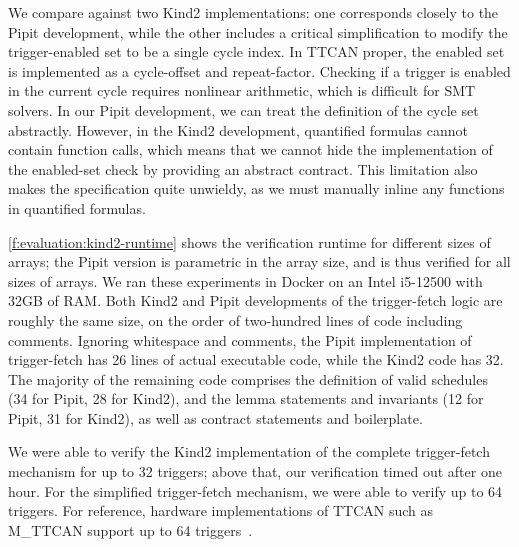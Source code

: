 We compare against two Kind2 implementations: one corresponds closely to the Pipit development, while the other includes a critical simplification to modify the trigger-enabled set to be a single cycle index.
In TTCAN proper, the enabled set is implemented as a cycle-offset and repeat-factor.
Checking if a trigger is enabled in the current cycle requires nonlinear arithmetic, which is difficult for SMT solvers.
In our Pipit development, we can treat the definition of the cycle set abstractly.
However, in the Kind2 development, quantified formulas cannot contain function calls, which means that we cannot hide the implementation of the enabled-set check by providing an abstract contract.
This limitation also makes the specification quite unwieldy, as we must manually inline any functions in quantified formulas.

\autoref{f:evaluation:kind2-runtime} shows the verification runtime for different sizes of arrays; the Pipit version is parametric in the array size, and is thus verified for all sizes of arrays.
We ran these experiments in Docker on an Intel i5-12500 with 32GB of RAM.
Both Kind2 and Pipit developments of the trigger-fetch logic are roughly the same size, on the order of two-hundred lines of code including comments.
Ignoring whitespace and comments, the Pipit implementation of trigger-fetch has 26 lines of actual executable code, while the Kind2 code has 32.
The majority of the remaining code comprises the definition of valid schedules (34 for Pipit, 28 for Kind2), and the lemma statements and invariants (12 for Pipit, 31 for Kind2), as well as contract statements and boilerplate.

We were able to verify the Kind2 implementation of the complete trigger-fetch mechanism for up to 32 triggers; above that, our verification timed out after one hour.
For the simplified trigger-fetch mechanism, we were able to verify up to 64 triggers.
For reference, hardware implementations of TTCAN such as M_TTCAN support up to 64 triggers~\cite{bosch2019mttcan}.


